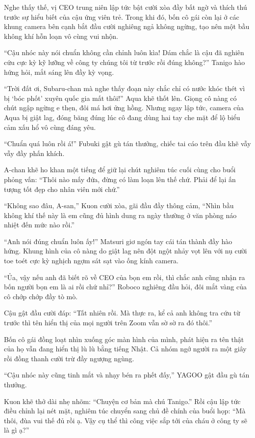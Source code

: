 \documentclass[../main.tex]{subfiles}
\begin{document}
Nghe thấy thế, vị CEO trung niên lập tức bật cười xòa đầy bất ngờ và thích thú trước sự hiểu biết của cậu ứng viên trẻ. Trong khi đó, bốn cô gái còn lại ở các khung camera bên cạnh bắt đầu cười nghiêng ngả không ngừng, tạo nên một bầu không khí hỗn loạn vô cùng vui nhộn.

``Cậu nhóc này nói chuẩn không cần chỉnh luôn kìa! Dám chắc là cậu đã nghiên cứu cực kỳ kỹ lưỡng về công ty chúng tôi từ trước rồi đúng không?'' Tanigo hào hứng hỏi, mắt sáng lên đầy kỳ vọng.

``Trời đất ơi, Subaru-chan mà nghe thấy đoạn này chắc chỉ có nước khóc thét vì bị `bóc phốt' xuyên quốc gia mất thôi!'' Aqua khẽ thốt lên. Giọng cô nàng có chút ngập ngừng e thẹn, đôi má hơi ửng hồng. Nhưng ngay lập tức, camera của Aqua bị giật lag, đóng băng đúng lúc cô đang dùng hai tay che mặt để lộ biểu cảm xấu hổ vô cùng đáng yêu.

``Chuẩn quá luôn rồi á!'' Fubuki gật gù tán thưởng, chiếc tai cáo trên đầu khẽ vẫy vẫy đầy phấn khích.

A-chan khẽ ho khan một tiếng để giữ lại chút nghiêm túc cuối cùng cho buổi phỏng vấn: ``Thôi nào mấy đứa, đừng có làm loạn lên thế chứ. Phải để lại ấn tượng tốt đẹp cho nhân viên mới chứ.''

``Không sao đâu, A-san,'' Kuon cười xòa, gãi đầu đầy thông cảm, ``Nhìn bầu không khí thế này là em cũng đủ hình dung ra ngày thường ở văn phòng náo nhiệt đến mức nào rồi.''

``Anh nói đúng chuẩn luôn ấy!'' Matsuri giơ ngón tay cái tán thành đầy hào hứng. Khung hình của cô nàng do giật lag nên đột ngột nhảy vọt lên với nụ cười toe toét cực kỳ nghịch ngợm sát sạt vào ống kính camera.

``Ủa, vậy nếu anh đã biết rõ về CEO của bọn em rồi, thì chắc anh cũng nhận ra bốn người bọn em là ai rồi chứ nhỉ?'' Roboco nghiêng đầu hỏi, đôi mắt vàng của cô chớp chớp đầy tò mò.

Cậu gật đầu cười đáp: ``Tất nhiên rồi. Mà thực ra, kể cả anh không tra cứu từ trước thì tên hiển thị của mọi người trên Zoom vẫn sờ sờ ra đó thôi.''

Bốn cô gái đồng loạt nhìn xuống góc màn hình của mình, phát hiện ra tên thật của họ vẫn đang hiển thị lù lù bằng tiếng Nhật. Cả nhóm ngớ người ra một giây rồi đồng thanh cười trừ đầy ngượng ngùng.

``Cậu nhóc này cũng tinh mắt và nhạy bén ra phết đấy,'' YAGOO gật đầu gù tán thưởng.

Kuon khẽ thở dài nhẹ nhõm: ``Chuyện cơ bản mà chú Tanigo.'' Rồi cậu lập tức điều chỉnh lại nét mặt, nghiêm túc chuyển sang chủ đề chính của buổi họp: ``Mà thôi, đùa vui thế đủ rồi ạ. Vậy cụ thể thì công việc sắp tới của cháu ở công ty sẽ là gì ạ?''
\end{document}
